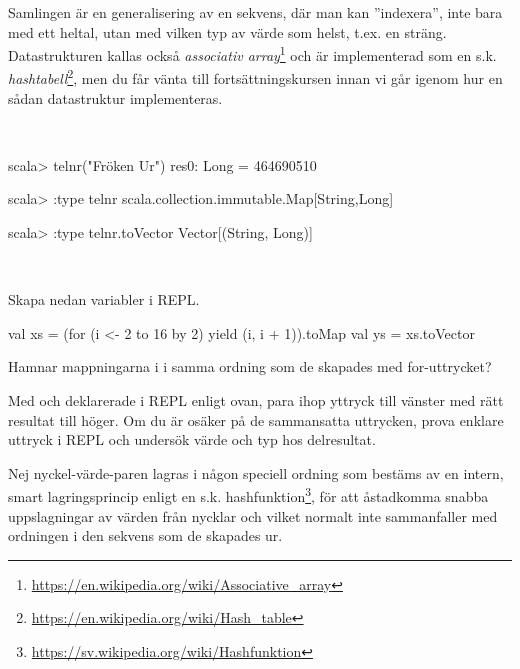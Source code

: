 Samlingen  är en generalisering av en sekvens, där man kan ''indexera'', inte bara med ett heltal, utan med vilken typ av värde som helst, t.ex. en sträng. Datastrukturen  kallas också \emph{associativ array}\footnote{\href{https://en.wikipedia.org/wiki/Associative_array}{https://en.wikipedia.org/wiki/Associative\_array}} och är implementerad som en s.k. \emph{hashtabell}\footnote{\href{https://en.wikipedia.org/wiki/Hash_table}{https://en.wikipedia.org/wiki/Hash\_table}}, men du får vänta till fortsättningskursen innan vi går igenom hur en sådan datastruktur implementeras.

\SOLUTION

\TaskSolved \what~

\begin{REPL}
scala> telnr("Fröken Ur")
res0: Long = 464690510

scala> :type telnr
scala.collection.immutable.Map[String,Long]

scala> :type telnr.toVector
Vector[(String, Long)]
\end{REPL}

\QUESTEND




\QUESTBEGIN

\Task \what~

\Subtask Skapa nedan variabler i REPL.
\begin{Code}
val xs = (for (i <- 2 to 16 by 2) yield (i, i + 1)).toMap
val ys = xs.toVector
\end{Code}
Hamnar mappningarna i  i samma ordning som de skapades med for-uttrycket?

\Subtask Med  och  deklarerade i REPL enligt ovan, para ihop yttryck till vänster med rätt resultat till höger. Om du är osäker på de sammansatta uttrycken, prova enklare uttryck i REPL och undersök värde och typ hos delresultat.

\begin{ConceptConnections}

\end{ConceptConnections}

\SOLUTION

\TaskSolved \what


\SubtaskSolved Nej nyckel-värde-paren lagras i någon speciell ordning som bestäms av en intern, smart lagringsprincip enligt en s.k. hashfunktion\footnote{\url{https://sv.wikipedia.org/wiki/Hashfunktion}}, för att åstadkomma snabba uppslagningar av värden från nycklar och vilket normalt inte sammanfaller med ordningen i den sekvens som de skapades ur.

